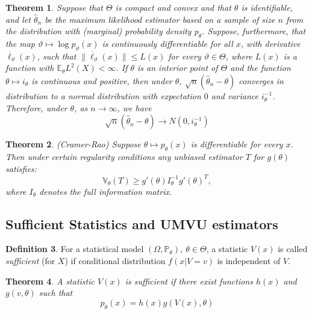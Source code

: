 \documentclass[12pt]{article}
\newtheorem{theorem}{Theorem}[section]
\theoremstyle{definition}
\newtheorem{definition}[theorem]{Definition}
\theoremstyle{remark}
\numberwithin{equation}{section}
\newcommand{\PP}{\mathbb{P}}
\newcommand{\EE}{\mathbb{E}}
\newcommand{\VV}{\mathbb{V}}
\begin{document}
\begin{theorem}
	Suppose that $\Theta$ is compact and convex and that $\theta$ is identifiable, and let $\hat{\theta}_n$ be the maximum likelihood estimator based on a sample of size $n$ from the distribution with (marginal) probability density $p_\theta$. Suppose, furthermore, that the map $\vartheta\mapsto \log p_\vartheta(x)$ is continuously differentiable for all $x$, with derivative $\dot{\ell_\vartheta}(x)$, such that $\|\dot{\ell_\vartheta}(x)\|\leq L(x)$ for every $\vartheta\in\Theta$, where $L(x)$ is a function with $\EE_\theta L^2(X)<\infty$.
	If $\theta$ is an interior point of $\Theta$ and the function $\theta\mapsto i_\theta$ is continuous and positive, then under $\theta$, $\sqrt{n}(\hat{\theta}_n - \theta)$
	converges in distribution to a normal distribution with expectation $0$ and variance $i^{-1}_\theta$. Therefore, under $\theta$, as $n\rightarrow\infty$, we have
	\begin{equation*}
		\sqrt{n}(\hat{\theta}_n - \theta) \rightarrow N(0, i_\theta^{-1})
	\end{equation*}
\end{theorem}

\begin{theorem}\label{cramerraobound}\emph{(Cramer-Rao)}
	Suppose $\theta\mapsto p_\theta(x)$ is differentiable for every $x$. Then under certain regularity conditions any unbiased estimator $T$ for $g(\theta)$ satisfies:
	\begin{equation*}
		\VV_\theta(T) \geq g'(\theta)I_\theta^{-1}g'(\theta)^T,
	\end{equation*}
	where $I_\theta$ denotes the \emph{full} information matrix.
\end{theorem}


\subsection{Sufficient Statistics and UMVU estimators}

\begin{definition}
	For a statistical model $(\Omega, \PP_\theta), \ \theta \in \Theta$, a statistic $V(x)$ is called \emph{sufficient} (for $X$) if conditional distribution $f(x|V = v)$ is independent of $V$.
\end{definition}

\begin{theorem}\label{factorizarion}
	A statistic $V(x)$ is sufficient if there exist functions $h(x)$ and $g(v, \theta)$ such that
	$$
	p_\theta(x) = h(x)g(V(x), \theta)
	$$
\end{theorem}
\end{document}
